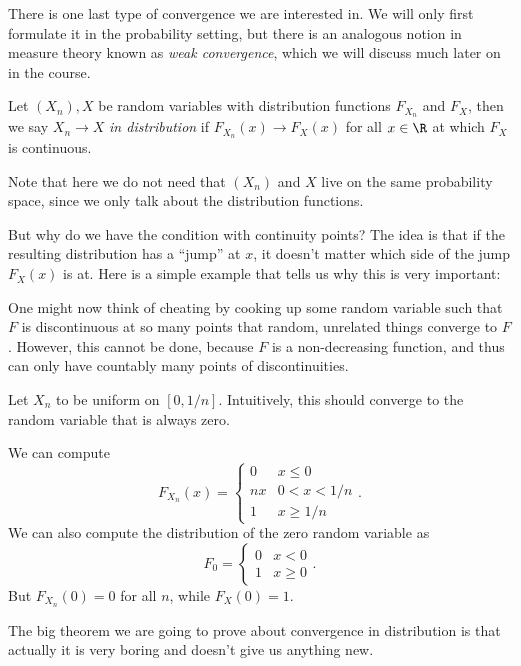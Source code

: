 \documentclass[a4paper]{article}
\begin{document}
There is one last type of convergence we are interested in. We will only first formulate it in the probability setting, but there is an analogous notion in measure theory known as \emph{weak convergence}, which we will discuss much later on in the course.
\begin{defi}
  Let $(X_n), X$ be random variables with distribution functions $F_{X_n}$ and $F_X$, then we say $X_n \to X$ \emph{in distribution} if $F_{X_n}(x) \to F_X(x)$ for all $x \in \R$ at which $F_X$ is continuous.
\end{defi}
Note that here we do not need that $(X_n)$ and $X$ live on the same probability space, since we only talk about the distribution functions.

But why do we have the condition with continuity points? The idea is that if the resulting distribution has a ``jump'' at $x$, it doesn't matter which side of the jump $F_X(x)$ is at. Here is a simple example that tells us why this is very important:

One might now think of cheating by cooking up some random variable such that $F$ is discontinuous at so many points that random, unrelated things converge to $F$. However, this cannot be done, because $F$ is a non-decreasing function, and thus can only have countably many points of discontinuities.

\begin{eg}
  Let $X_n$ to be uniform on $[0, 1/n]$. Intuitively, this should converge to the random variable that is always zero.

  We can compute
  \[
    F_{X_n} (x) =
    \begin{cases}
      0 & x \leq 0\\
      nx & 0 < x< 1/n\\
      1 & x \geq 1/n
    \end{cases}.
  \]
  We can also compute the distribution of the zero random variable as
  \[
    F_0 =
    \begin{cases}
      0 & x < 0\\
      1 & x \geq 0
    \end{cases}.
  \]
  But $F_{X_n}(0) = 0 $ for all $n$, while $F_X(0) = 1$.
\end{eg}

The big theorem we are going to prove about convergence in distribution is that actually it is very boring and doesn't give us anything new.
\end{document}
